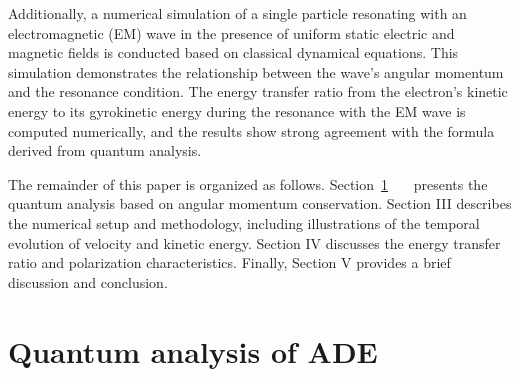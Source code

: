 \documentclass{cpbtex}
\begin{document}
\begin{CJK*}{GBK}{song}
 Additionally, a numerical simulation of a single particle resonating with an electromagnetic (EM) wave in the presence of uniform static electric and magnetic fields is conducted based on classical dynamical equations. This simulation demonstrates the relationship between the wave’s angular momentum and the resonance condition. The energy transfer ratio from the electron's kinetic energy to its gyrokinetic energy during the resonance with the EM wave is computed numerically, and the results show strong agreement with the formula derived from quantum analysis.

The remainder of this paper is organized as follows. Section~\ref{Quantum}~ ~~presents the quantum analysis based on angular momentum conservation. Section III describes the numerical setup and methodology, including illustrations of the temporal evolution of velocity and kinetic energy. Section IV discusses the energy transfer ratio and polarization characteristics. Finally, Section V provides a brief discussion and conclusion.

\section{Quantum analysis of ADE}\label{Quantum}


\end{CJK*}
\end{document}

